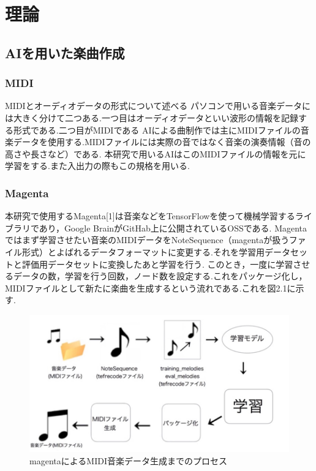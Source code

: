 \chapter{理論}
\section{AIを用いた楽曲作成}
\subsection{MIDI}
MIDIとオーディオデータの形式について述べる
パソコンで用いる音楽データには大きく分けて二つある.一つ目はオーディオデータといい波形の情報を記録する形式である.二つ目がMIDIである
AIによる曲制作では主にMIDIファイルの音楽データを使用する.MIDIファイルには実際の音ではなく音楽の演奏情報（音の高さや長さなど）である.
本研究で用いるAIはこのMIDIファイルの情報を元に学習をする.また入出力の際もこの規格を用いる.
\subsection{Magenta}
本研究で使用するMagenta[1]は音楽などをTensorFlowを使って機械学習するライブラリであり，Google BrainがGitHab上に公開されているOSSである.
Magentaではまず学習させたい音楽のMIDIデータをNoteSequence（magentaが扱うファイル形式）とよばれるデータフォーマットに変更する.それを学習用データセットと評価用データセットに変換したあと学習を行う.
このとき，一度に学習させるデータの数，学習を行う回数，ノード数を設定する.これをパッケージ化し，MIDIファイルとして新たに楽曲を生成するという流れである.これを図2.1に示す.
\newpage
\begin{figure}[h]
\begin{screen}
\begin{center}
\includegraphics[scale=1.7, clip]{./img/magenta_usestep.png}
\caption{magentaによるMIDI音楽データ生成までのプロセス}
\label{fig:magentaによるMIDI音楽データ生成までのプロセス}
\end{center}
\end{screen}
\end{figure}
